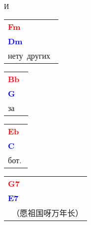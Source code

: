 \documentclass[12pt,a4paper,openany,UTF8]{memoir}
\begin{document}
И~\begin{tabular}[b]{l}
    \textbf{\textcolor{red}{Fm\ }}\\\textbf{\textcolor{blue}{Dm\ }}\\
    нету~других~\mbox{}\end{tabular}\begin{tabular}[b]{l}
    \textbf{\textcolor{red}{Bb\ }}\\\textbf{\textcolor{blue}{G\ }}\\
    за\mbox{}\end{tabular}\begin{tabular}[b]{l}
    \textbf{\textcolor{red}{Eb\ }}\\\textbf{\textcolor{blue}{C\ }}\\
    бот.\mbox{}\end{tabular}\begin{tabular}[b]{l}
    \textbf{\textcolor{red}{G7\ }}\\\textbf{\textcolor{blue}{E7\ }}\\
    ~（愿祖国呀万年长）\mbox{}\end{tabular}

    \vspace{\parskip}
\end{document}
